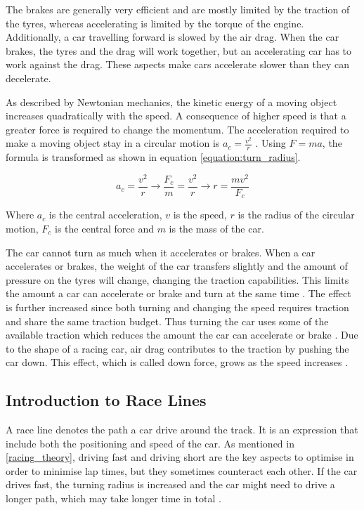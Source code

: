 The brakes are generally very efficient and are mostly limited by the traction of the tyres, whereas accelerating is limited by the torque of the engine. Additionally, a car travelling forward is slowed by the air drag. When the car brakes, the tyres and the drag will work together, but an accelerating car has to work against the drag. These aspects make cars accelerate slower than they can decelerate.

As described by Newtonian mechanics, the kinetic energy of a moving object increases quadratically with the speed. A consequence of higher speed is that a greater force is required to change the momentum. The acceleration required to make a moving object stay in a circular motion is \(a_c=\frac{v^2}{r}\)  \cite{beckman}. Using \(F=ma\), the formula is transformed as shown in equation \ref{equation:turn_radius}. 

\begin{equation}
\label{equation:turn_radius}
a_c = \frac{v^2}{r} 
\rightarrow
\frac{F_c}{m} = \frac{v^2}{r} 
\rightarrow
r = \frac{mv^2}{F_c}
\end{equation}

\noindent
Where $a_c$ is the central acceleration, $v$ is the speed, $r$ is the radius of the circular motion, $F_c$ is the central force and $m$ is the mass of the car. 

The car cannot turn as much when it accelerates or brakes. When a car accelerates or brakes, the weight of the car transfers slightly and the amount of pressure on the tyres will change, changing the traction capabilities. This limits the amount a car can accelerate or brake and turn at the same time \cite{beckman}. The effect is further increased since both turning and changing the speed requires traction and share the same traction budget. Thus turning the car uses some of the available traction which reduces the amount the car can accelerate or brake \cite{beckman, edmondson}. Due to the shape of a racing car, air drag contributes to the traction by pushing the car down. This effect, which is called down force, grows as the speed increases \cite{beckman}.

\subsection{Introduction to Race Lines}
\label{racing_theory:lines}
A race line denotes the path a car drive around the track. It is an expression that include both the positioning and speed of the car. As mentioned in \ref{racing_theory}, driving fast and driving short are the key aspects to optimise in order to minimise lap times, but they sometimes counteract each other. If the car drives fast, the turning radius is increased and the car might need to drive a longer path, which may take longer time in total \cite{edmondson}. 


